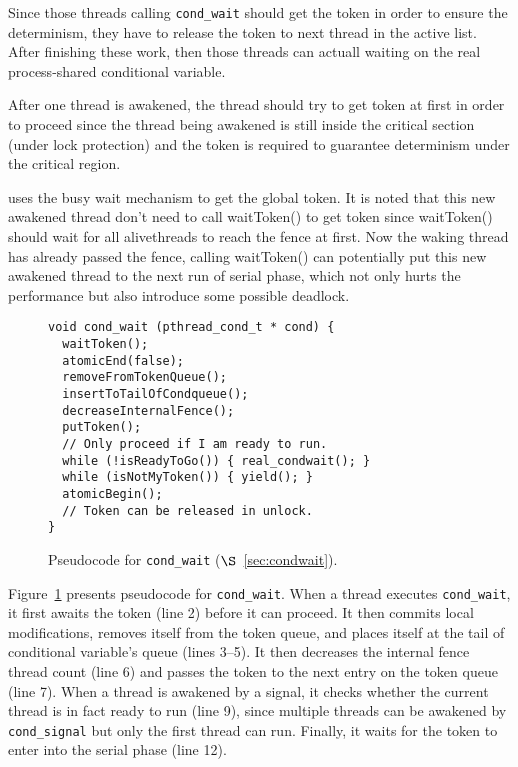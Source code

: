 Since those threads calling \texttt{cond\_wait} should get the token in order
to ensure the determinism, they have to release the token to next
thread in the active list. After finishing these work, then those
threads can actuall waiting on the real process-shared conditional
variable.

After one thread is awakened, the thread should try to get token at
first in order to proceed since the thread being awakened is 
still inside the critical section (under lock protection)
and the token is required to guarantee determinism under the critical region. 

\dthreads{} uses the busy wait mechanism to get the global token. 
It is noted that this new awakened thread don't need to call waitToken() to get
token since waitToken() should wait for all alivethreads to reach the fence at first. 
Now the waking thread has already passed the fence, calling waitToken() can potentially
put this new awakened thread to the next run of serial phase, which not only hurts
the performance but also introduce some possible deadlock.

\begin{figure}
\begin{lstlisting}
void cond_wait (pthread_cond_t * cond) {
  waitToken();
  atomicEnd(false);
  removeFromTokenQueue();
  insertToTailOfCondqueue();
  decreaseInternalFence();
  putToken();
  // Only proceed if I am ready to run.
  while (!isReadyToGo()) { real_condwait(); }
  while (isNotMyToken()) { yield(); } 
  atomicBegin();
  // Token can be released in unlock. 
}
\end{lstlisting}
\caption{Pseudocode for \texttt{cond\_wait} ($\S$~\ref{sec:condwait}). 
\label{fig:condwait}}
\end{figure}

Figure~\ref{fig:condwait} presents pseudocode
for \texttt{cond\_wait}.  When a thread executes \texttt{cond\_wait},
it first awaits the token (line 2) before it can proceed.  It then
commits local modifications, removes itself from the token queue, and
places itself at the tail of conditional variable's queue (lines
3--5). It then decreases the internal fence thread count (line 6) and passes
the token to the next entry on the token queue (line 7). When a thread
is awakened by a signal, it checks whether the current thread is in
fact ready to run (line 9), since multiple threads can be awakened
by \texttt{cond\_signal} but only the first thread can run.  Finally,
it waits for the token to enter into the serial phase (line 12). 

